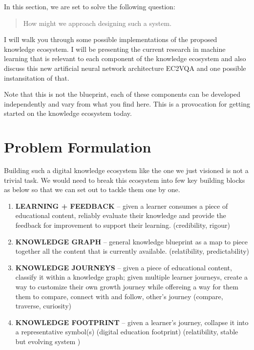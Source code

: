 \documentclass[]{book}
\theoremstyle{definition}
\theoremstyle{definition}
\theoremstyle{definition}
\theoremstyle{remark}
\begin{document}
In this section, we are set to solve the following question:

\begin{quote}
How might we approach designing such a system.
\end{quote}

I will walk you through some possible implementations of the proposed
knowledge ecosystem. I will be presenting the current research in
machine learning that is relevant to each component of the knowledge
ecosystem and also discuss this new artificial neural network
architecture EC2VQA and one possible instansitation of that.

Note that this is not the blueprint, each of these components can be
developed independently and vary from what you find here. This is a
provocation for getting started on the knowledge ecosystem today.

\section{Problem Formulation}\label{problem-formulation}

Building such a digital knowledge ecosystem like the one we just
visioned is not a trivial task. We would need to break this ecosystem
into few key building blocks as below so that we can set out to tackle
them one by one.

\begin{enumerate}
\def\labelenumi{\arabic{enumi}.}
\item
  \textbf{LEARNING + FEEDBACK} -- given a learner consumes a piece of
  educational content, reliably evaluate their knowledge and provide the
  feedback for improvement to support their learning. (credibility,
  rigour)
\item
  \textbf{KNOWLEDGE GRAPH} -- general knowledge blueprint as a map to
  piece together all the content that is currently available.
  (relatibility, predictability)
\item
  \textbf{KNOWLEDGE JOURNEYS} -- given a piece of educational content,
  classify it within a knowledge graph; given multiple learner journeys,
  create a way to customize their own growth journey while offereing a
  way for them them to compare, connect with and follow, other's journey
  (compare, traverse, curiosity)
\item
  \textbf{KNOWLEDGE FOOTPRINT} -- given a learner's journey, collapse it
  into a representative symbol(s) (digital education footprint)
  (relatibility, stable but evolving system )
\end{enumerate}
\end{document}

